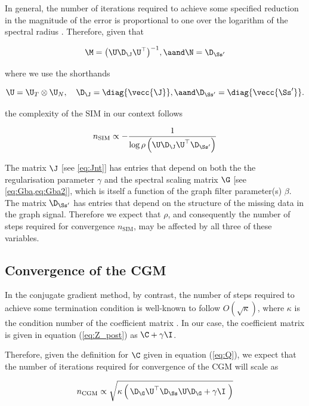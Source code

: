 In general, the number of iterations required to achieve some specified reduction in the magnitude of the error is proportional to one over the logarithm of the spectral radius \citep{Demmel1997}. Therefore, given that 

$$
\M = \big(\U \D_\J \U^\top\big)^{-1}, \aand \N = \D_{\Ss'}
$$

where we use the shorthands

$$
\U = \U_T \otimes \U_N, \quad \D_\J = \diag{\vecc{\J}}, \aand \D_{\Ss'} = \diag{\vecc{\Ss'}}. 
$$



the complexity of the SIM in our context follows


\begin{equation}
    \label{eq:n_SIM}
    n_{\text{SIM}} \propto  -\frac{1}{\log\rho\left(\U \D_\J \U^\top \D_{\Ss'} \right)}
\end{equation}

The matrix $\J$ [see \cref{eq:Jnt}] has entries that depend on both the the regularisation parameter $\gamma$ and the spectral scaling matrix $\G$ [see \cref{eq:Gba,eq:Gba2}], which is itself a function of the graph filter parameter(s) $\beta$. The matrix $\D_{\Ss'}$  has entries that depend on the structure of the missing data in the graph signal. Therefore we expect that $\rho$, and consequently the number of steps required for convergence $n_{\text{SIM}}$, may be affected by all three of these variables.  


\subsection{Convergence of the CGM}

In the conjugate gradient method, by contrast, the number of steps required to achieve some termination condition is well-known to follow $O(\sqrt{\kappa})$, where $\kappa$ is the condition number of the coefficient matrix \cite{Kelley1995}. In our case, the coefficient matrix is given in equation (\ref{eq:Z_post}) as $\C + \gamma \I$. 



Therefore, given the definition for $\C$ given in equation (\ref{eq:Q}), we expect that the number of iterations required for convergence of the CGM will scale as

\begin{equation}
    \label{eq:n_CGM}
     n_{\text{CGM}} \propto \sqrt{\kappa \left(  \, \D_\G \U^\top \D_{\Ss} \U \D_\G + \gamma \I \; \right)}
\end{equation}

